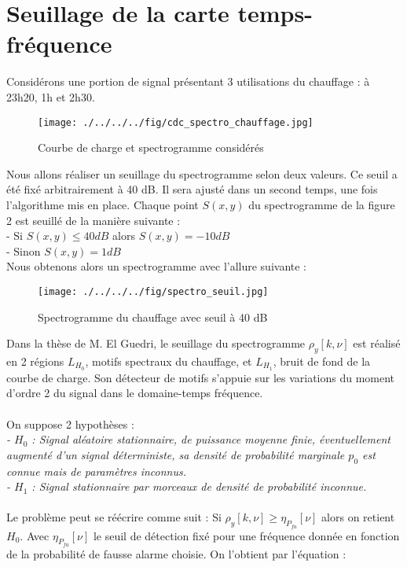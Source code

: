 \documentclass[10pt,a4paper]{article}
\begin{document}
\newpage

 
\section{Seuillage de la carte temps-fréquence}
Considérons une portion de signal présentant 3 utilisations du chauffage : à 23h20, 1h et 2h30.

\begin{figure}[!h]
\begin{center}
\texttt{[image: ./../../../fig/cdc\_spectro\_chauffage.jpg]}
\caption{Courbe de charge et spectrogramme considérés}
\label{Figure}
\end{center}
\end{figure}
 
Nous allons réaliser un seuillage du spectrogramme selon deux valeurs.
Ce seuil a été fixé arbitrairement à 40 dB. Il sera ajusté dans un second temps, une fois l'algorithme mis en place.
Chaque point $S(x,y)$ du spectrogramme de la figure 2 est seuillé de la manière suivante : \\
- Si $S(x,y) \le 40 dB$ alors $S(x,y) = -10 dB$ \\
- Sinon $S(x,y) = 1 dB$ \\

Nous obtenons alors un spectrogramme avec l'allure suivante :

\begin{figure}[!h]
\begin{center}
\texttt{[image: ./../../../fig/spectro\_seuil.jpg]}
\caption{Spectrogramme du chauffage avec seuil à 40 dB}
\label{Figure}
\end{center}
\end{figure}

Dans la thèse de M. El Guedri, le seuillage du spectrogramme $\rho_y[k,\nu]$ est réalisé en 2 régions $L_{H_0}$, motifs spectraux du chauffage, et $L_{H_1}$, bruit de fond de la courbe de charge. Son détecteur de motifs s'appuie sur les variations du moment d'ordre 2 du signal dans le domaine-temps fréquence.
\\
\\
On suppose 2 hypothèses :\\
\textit{- $H_0$ : Signal aléatoire stationnaire, de puissance moyenne finie, éventuellement augmenté d'un signal déterministe, sa densité de probabilité marginale $p_0$ est connue mais de paramètres inconnus.\\
- $H_1$ : Signal stationnaire par morceaux de densité de probabilité inconnue.}
\\
\\
Le problème peut se réécrire comme suit : 
Si $\rho_y[k,\nu] \ge \eta_{P_{fa}}[\nu]$ alors on retient $H_0$.
Avec $\eta_{P_{fa}}[\nu]$ le seuil de détection fixé pour une fréquence donnée en fonction de la probabilité de fausse alarme choisie. On l'obtient par l'équation :
\end{document}
